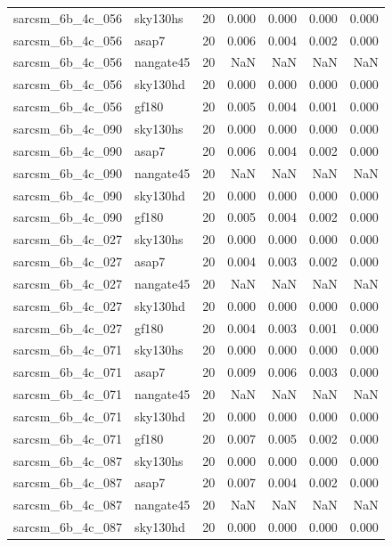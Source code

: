 \begin{tabular}{llrrrrr}
sarcsm\_6b\_4c\_056 & sky130hs & 20 & 0.000 & 0.000 & 0.000 & 0.000 \\
sarcsm\_6b\_4c\_056 & asap7 & 20 & 0.006 & 0.004 & 0.002 & 0.000 \\
sarcsm\_6b\_4c\_056 & nangate45 & 20 & NaN & NaN & NaN & NaN \\
sarcsm\_6b\_4c\_056 & sky130hd & 20 & 0.000 & 0.000 & 0.000 & 0.000 \\
sarcsm\_6b\_4c\_056 & gf180 & 20 & 0.005 & 0.004 & 0.001 & 0.000 \\
sarcsm\_6b\_4c\_090 & sky130hs & 20 & 0.000 & 0.000 & 0.000 & 0.000 \\
sarcsm\_6b\_4c\_090 & asap7 & 20 & 0.006 & 0.004 & 0.002 & 0.000 \\
sarcsm\_6b\_4c\_090 & nangate45 & 20 & NaN & NaN & NaN & NaN \\
sarcsm\_6b\_4c\_090 & sky130hd & 20 & 0.000 & 0.000 & 0.000 & 0.000 \\
sarcsm\_6b\_4c\_090 & gf180 & 20 & 0.005 & 0.004 & 0.002 & 0.000 \\
sarcsm\_6b\_4c\_027 & sky130hs & 20 & 0.000 & 0.000 & 0.000 & 0.000 \\
sarcsm\_6b\_4c\_027 & asap7 & 20 & 0.004 & 0.003 & 0.002 & 0.000 \\
sarcsm\_6b\_4c\_027 & nangate45 & 20 & NaN & NaN & NaN & NaN \\
sarcsm\_6b\_4c\_027 & sky130hd & 20 & 0.000 & 0.000 & 0.000 & 0.000 \\
sarcsm\_6b\_4c\_027 & gf180 & 20 & 0.004 & 0.003 & 0.001 & 0.000 \\
sarcsm\_6b\_4c\_071 & sky130hs & 20 & 0.000 & 0.000 & 0.000 & 0.000 \\
sarcsm\_6b\_4c\_071 & asap7 & 20 & 0.009 & 0.006 & 0.003 & 0.000 \\
sarcsm\_6b\_4c\_071 & nangate45 & 20 & NaN & NaN & NaN & NaN \\
sarcsm\_6b\_4c\_071 & sky130hd & 20 & 0.000 & 0.000 & 0.000 & 0.000 \\
sarcsm\_6b\_4c\_071 & gf180 & 20 & 0.007 & 0.005 & 0.002 & 0.000 \\
sarcsm\_6b\_4c\_087 & sky130hs & 20 & 0.000 & 0.000 & 0.000 & 0.000 \\
sarcsm\_6b\_4c\_087 & asap7 & 20 & 0.007 & 0.004 & 0.002 & 0.000 \\
sarcsm\_6b\_4c\_087 & nangate45 & 20 & NaN & NaN & NaN & NaN \\
sarcsm\_6b\_4c\_087 & sky130hd & 20 & 0.000 & 0.000 & 0.000 & 0.000 \\

\end{tabular}
